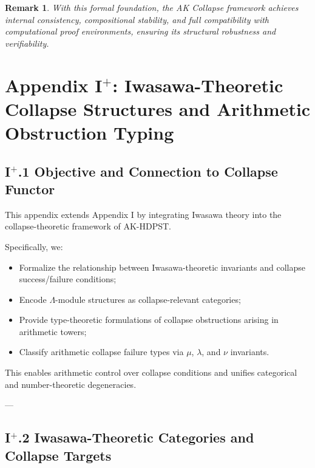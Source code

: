 \documentclass[11pt]{article}
\newtheorem{remark}[theorem]{Remark}
\begin{document}
\begin{remark}
With this formal foundation, the AK Collapse framework achieves internal consistency, compositional stability, and full compatibility with computational proof environments, ensuring its structural robustness and verifiability.
\end{remark}




\section*{Appendix I$^{+}$: Iwasawa-Theoretic Collapse Structures and Arithmetic Obstruction Typing}

\subsection*{I$^{+}$.1 Objective and Connection to Collapse Functor}

This appendix extends Appendix I by integrating Iwasawa theory into the collapse-theoretic framework of AK-HDPST.

Specifically, we:
\begin{itemize}
    \item Formalize the relationship between Iwasawa-theoretic invariants and collapse success/failure conditions;
    \item Encode $\Lambda$-module structures as collapse-relevant categories;
    \item Provide type-theoretic formulations of collapse obstructions arising in arithmetic towers;
    \item Classify arithmetic collapse failure types via $\mu$, $\lambda$, and $\nu$ invariants.
\end{itemize}

This enables arithmetic control over collapse conditions and unifies categorical and number-theoretic degeneracies.

---

\subsection*{I$^{+}$.2 Iwasawa-Theoretic Categories and Collapse Targets}
\end{document}
